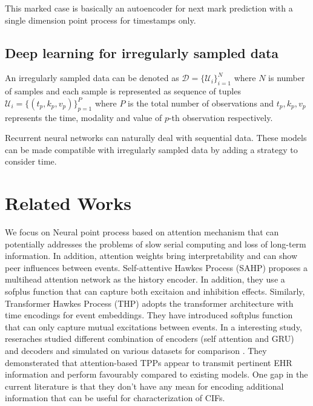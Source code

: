 \documentclass[journal,twoside,web]{ieeecolor}
\begin{document}
This marked case is basically an autoencoder for next mark prediction with a single dimension point process for timestamps only.

\subsection{Deep learning for irregularly sampled data}
An irregularly sampled data can be denoted as $\mathcal{D}=\{\mathcal{U}_i\}_{i=1}^{N}$ where $N$ is number of samples and each sample is represented as sequence of tuples $\mathcal{U}_i=\{(t_p,k_p,v_p)\}_{p=1}^{P}$ where $P$ is the total number of observations and $t_p, k_p, v_p$ represents the time, modality and value of $p$-th observation respectively.

Recurrent neural networks can naturally deal with sequential data. These models can be made compatible with irregularly sampled data by adding a strategy to consider time.

\section{Related Works}
\label{sec:Related Works}

We focus on Neural point process based on attention mechanism that can potentially addresses the problems of slow serial computing and loss of long-term information. In addition, attention weights bring interpretability and can show peer influences between events. Self-attentive Hawkes Process (SAHP) \cite*{zhangSelfAttentiveHawkesProcess2020} proposes a multihead attention network as the history encoder. In addition, they use a sofplus function that can capture both excitaion and inhibition effects. Similarly, Transformer Hawkes Process (THP) \cite*{zuoTransformerHawkesProcess2020a} adopts the transformer architecture \cite*{vaswaniAttentionAllYou2017} with time encodings for event embeddings. They have introduced softplus function that can only capture mutual excitations between events. In a interesting study, reseraches studied different combination of encoders (self attention and GRU) and decoders and simulated on various datasets for comparison \cite*{enguehardNeuralTemporalPoint2020}. They demonsterated that attention-based TPPs appear to transmit pertinent EHR information and perform favourably compared to existing models. One gap in the current literature is that they don't have any mean for encoding additional information that can be useful for characterization of CIFs.
\end{document}

